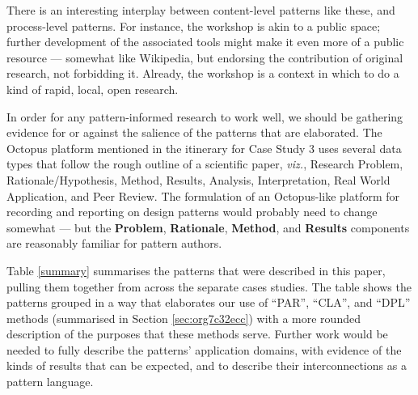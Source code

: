 \documentclass[acmlarge,timestamp]{acmart}
\begin{document}
There is an interesting interplay between content-level patterns like
these, and process-level patterns.  For instance, the workshop is akin
to a public space; further development of the associated tools might
make it even more of a public resource — somewhat like Wikipedia, but endorsing the contribution of original research, not forbidding it.  Already, the workshop is a context in which to do a kind of rapid, local, open research.

In order for any pattern-informed research to work well, we should be gathering evidence for or against the salience of the patterns that are elaborated.  The Octopus platform mentioned in the itinerary for Case Study 3 uses several data types that follow the rough outline of a scientific paper, \emph{viz.},
Research Problem,
Rationale/Hypothesis,
Method,
Results,
Analysis,
Interpretation,
Real World Application, and
Peer Review.
The formulation of an Octopus-like platform for recording and reporting on design patterns would probably need to change somewhat — but the \textbf{Problem}, \textbf{Rationale}, \textbf{Method}, and \textbf{Results} components are reasonably familiar for pattern authors.

Table \ref{summary} summarises the patterns that were described in
this paper, pulling them together from across the separate cases studies.  The table shows the patterns grouped in a way that elaborates
our use of “PAR”, “CLA”, and “DPL” methods (summarised in Section \ref{sec:org7c32ecc}) with a more rounded
description of the purposes that these methods serve.  Further work
would be needed to fully describe the patterns’
application domains, with evidence of the kinds of results that can be expected, and to describe their interconnections as a pattern language.
\end{document}
